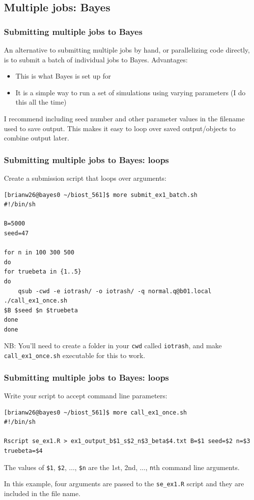 \documentclass[12pt, 
hyperref={colorlinks=true, linkcolor=blue, urlcolor=cyan}]{beamer}
\newcommand{\myframe}[1]{\begin{frame} \frametitle{#1}}
\begin{document}
\subsection{Multiple jobs: Bayes}
\myframe{Submitting multiple jobs to Bayes}
An alternative to submitting multiple jobs by hand, or parallelizing code directly, is to submit a batch of individual jobs to Bayes. Advantages:
\begin{itemize}
\item This is what Bayes is set up for
\item It is a simple way to run a set of simulations using varying parameters (I do this all the time)
\end{itemize}

I recommend including seed number and other parameter values in the filename used to save output. This makes it easy to loop over saved output/objects to combine output later.
\end{frame}

\begin{frame}[fragile]
\frametitle{Submitting multiple jobs to Bayes: loops}

Create a submission script that loops over arguments: 
{\scriptsize
\begin{verbatim}
[brianw26@bayes0 ~/biost_561]$ more submit_ex1_batch.sh
#!/bin/sh

B=5000
seed=47

for n in 100 300 500
do
for truebeta in {1..5}
do
    qsub -cwd -e iotrash/ -o iotrash/ -q normal.q@b01.local ./call_ex1_once.sh
$B $seed $n $truebeta
done
done
\end{verbatim}
}

NB: You'll need to create a folder in your \texttt{cwd} called \texttt{iotrash}, and make \texttt{call\_ex1\_once.sh} executable for this to work.
\end{frame}

\begin{frame}[fragile]
\frametitle{Submitting multiple jobs to Bayes: loops}
Write your script to accept command line parameters:
{\fontsize{9pt}{7.2}\selectfont
\begin{verbatim}
[brianw26@bayes0 ~/biost_561]$ more call_ex1_once.sh
#!/bin/sh

Rscript se_ex1.R > ex1_output_b$1_s$2_n$3_beta$4.txt B=$1 seed=$2 n=$3 
truebeta=$4
\end{verbatim}
}
The values of \texttt{\$1}, \texttt{\$2}, $\dots$, \texttt{\$n} are the 1st, 2nd, $\dots$, \texttt{n}th command line arguments.

In this example, four arguments are passed to the \texttt{se\_ex1.R} script and they are included in the file name.
\end{frame}
\end{document}
